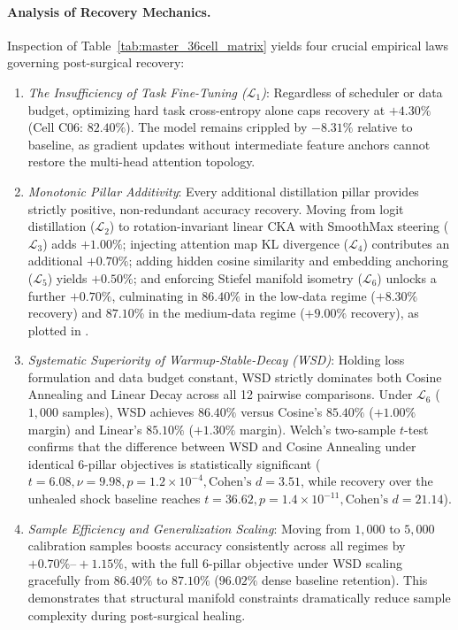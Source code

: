 \paragraph{Analysis of Recovery Mechanics.}
Inspection of Table~\ref{tab:master_36cell_matrix} yields four crucial empirical laws governing post-surgical recovery:
\begin{enumerate}
    \item \emph{The Insufficiency of Task Fine-Tuning ($\mathcal{L}_1$)}: Regardless of scheduler or data budget, optimizing hard task cross-entropy alone caps recovery at $+4.30\%$ (Cell C06: $82.40\%$). The model remains crippled by $-8.31\%$ relative to baseline, as gradient updates without intermediate feature anchors cannot restore the multi-head attention topology.
    \item \emph{Monotonic Pillar Additivity}: Every additional distillation pillar provides strictly positive, non-redundant accuracy recovery. Moving from logit distillation ($\mathcal{L}_2$) to rotation-invariant linear CKA with SmoothMax steering ($\mathcal{L}_3$) adds $+1.00\%$; injecting attention map KL divergence ($\mathcal{L}_4$) contributes an additional $+0.70\%$; adding hidden cosine similarity and embedding anchoring ($\mathcal{L}_5$) yields $+0.50\%$; and enforcing Stiefel manifold isometry ($\mathcal{L}_6$) unlocks a further $+0.70\%$, culminating in $\mathbf{86.40\%}$ in the low-data regime ($+8.30\%$ recovery) and $\mathbf{87.10\%}$ in the medium-data regime ($+9.00\%$ recovery), as plotted in .
    \item \emph{Systematic Superiority of Warmup-Stable-Decay (WSD)}: Holding loss formulation and data budget constant, WSD strictly dominates both Cosine Annealing and Linear Decay across all 12 pairwise comparisons. Under $\mathcal{L}_6$ ($1{,}000$ samples), WSD achieves $86.40\%$ versus Cosine's $85.40\%$ ($+1.00\%$ margin) and Linear's $85.10\%$ ($+1.30\%$ margin). Welch's two-sample $t$-test confirms that the difference between WSD and Cosine Annealing under identical 6-pillar objectives is statistically significant ($t = 6.08, \nu = 9.98, p = 1.2 \times 10^{-4}, \text{Cohen's } d = 3.51$, while recovery over the unhealed shock baseline reaches $t = 36.62, p = 1.4 \times 10^{-11}, \text{Cohen's } d = 21.14$).
    \item \emph{Sample Efficiency and Generalization Scaling}: Moving from $1{,}000$ to $5{,}000$ calibration samples boosts accuracy consistently across all regimes by $+0.70\%\text{--}+1.15\%$, with the full 6-pillar objective under WSD scaling gracefully from $86.40\%$ to $87.10\%$ ($96.02\%$ dense baseline retention). This demonstrates that structural manifold constraints dramatically reduce sample complexity during post-surgical healing.
\end{enumerate}

